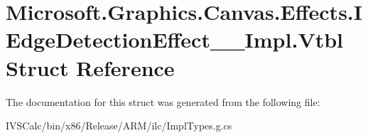 \hypertarget{struct_microsoft_1_1_graphics_1_1_canvas_1_1_effects_1_1_i_edge_detection_effect_____impl_1_1_vtbl}{}\section{Microsoft.\+Graphics.\+Canvas.\+Effects.\+I\+Edge\+Detection\+Effect\+\_\+\+\_\+\+Impl.\+Vtbl Struct Reference}
\label{struct_microsoft_1_1_graphics_1_1_canvas_1_1_effects_1_1_i_edge_detection_effect_____impl_1_1_vtbl}


The documentation for this struct was generated from the following file\+:\begin{DoxyCompactItemize}
\item 
I\+V\+S\+Calc/bin/x86/\+Release/\+A\+R\+M/ilc/Impl\+Types.\+g.\+cs\end{DoxyCompactItemize}
